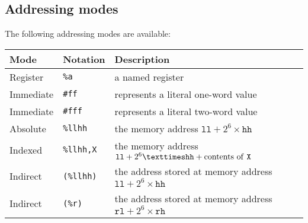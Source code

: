 \documentclass[a5paper,onecolumn,final,10pt]{memoir}
\let\ttt\texttt
\begin{document}

\subsection*{Addressing modes}

The following addressing modes are available:


\begin{center}
\begin{tabular}{|l|l|l|}
	\hline
	\textbf{Mode} & \textbf{Notation} & \textbf{Description} \\ \hline
	Register  & \ttt{\%a} & a named register \\ \hline
	Immediate & \ttt{\#ff} & represents a literal one-word value \\ \hline
	Immediate & \ttt{\#fff} & represents a literal two-word value \\ \hline
	Absolute  & \ttt{\%llhh} & the memory address $\ttt{ll}+2^6×\ttt{hh}$ \\ \hline
	Indexed   & \ttt{\%llhh,X} & the memory address $\ttt{ll}+2^6×\ttt{hh}+\textrm{contents of \ttt{X}}$ \\ \hline
	Indirect  & \hspace{-0.2em}\ttt{(\%llhh)} & the address stored at memory address $\ttt{ll}+2^6×\ttt{hh}$  \\ \hline
	Indirect  & \hspace{-0.2em}\ttt{(\%r)}\footnotemark & the address stored at memory address $\ttt{rl}+2^6×\ttt{rh}$ \\ \hline
\end{tabular}
\end{center}
\end{document}
